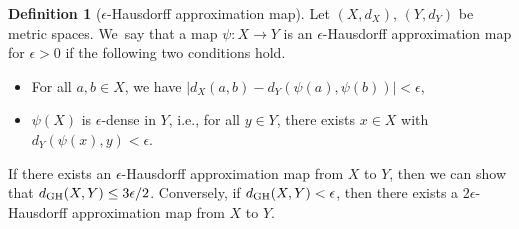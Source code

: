 \documentclass[10pt,a4paper]{amsart}
\numberwithin{equation}{section}
\theoremstyle{definition}
\newtheorem{Def}[Thm]{Definition}
\begin{document}
\begin{Def}[$\epsilon$-Hausdorff approximation map]\label{hap}
Let $(X,d_X)$, $(Y,d_Y)$ be metric spaces.
We~say that a map $\psi\colon X\to Y$ is an $\epsilon$-Hausdorff approximation map for $\epsilon>0$ if the following two conditions hold.
\begin{itemize}\itemsep=0pt
\item[(i)] For all $a,b\in X$, we have $|d_X(a,b)-d_Y(\psi(a),\psi(b))|< \epsilon$,
\item[(ii)] $\psi(X)$ is $\epsilon$-dense in $Y$, i.e., for all $y\in Y$, there exists $x\in X$ with $d_Y(\psi(x),y)< \epsilon$.
\end{itemize}
\end{Def}
If there exists an $\epsilon$-Hausdorff approximation map from $X$ to $Y$, then we can show that $d_{{\rm GH}}(X,Y)\leq 3\epsilon/2$.
Conversely, if $d_{{\rm GH}}(X,Y)< \epsilon$, then there exists a $2\epsilon$-Hausdorff approximation map from $X$ to $Y$.
\end{document}

